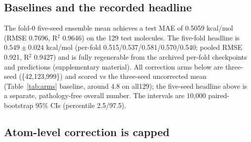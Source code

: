 \documentclass{article}
\begin{document}
\subsection{Baselines and the recorded headline}

The fold-0 five-seed ensemble mean achieves a test MAE of 0.5059 kcal/mol
(RMSE 0.7696, R$^2$ 0.9646) on the 129 test molecules. The five-fold
headline is $0.549 \pm 0.024$ kcal/mol (per-fold
0.515/0.537/0.581/0.570/0.540; pooled RMSE 0.921, R$^2$ 0.9427) and is fully
regenerable from the archived per-fold checkpoints and predictions
(supplementary material). All correction
arms below are three-seed (\{42,123,999\}) and scored vs the three-seed
uncorrected mean (Table~\ref{tab:arms} baseline, around 4.8 on all129); the
five-seed headline above is a separate, pathology-free overall number. The
intervals are 10{,}000 paired-bootstrap 95\% CIs (percentile 2.5/97.5).

\subsection{Atom-level correction is capped}
\end{document}
